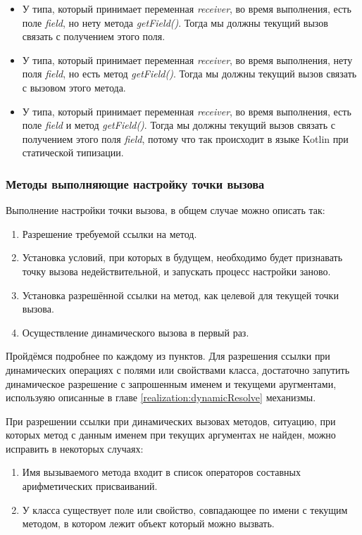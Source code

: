 \begin{itemize}
    \item У типа, который принимает переменная \textit{receiver}, во время выполнения, есть поле \textit{field}, но нету метода \textit{getField()}. Тогда мы должны текущий вызов связать с получением этого поля.
    \item У типа, который принимает переменная \textit{receiver}, во время выполнения, нету поля \textit{field}, но есть метод \textit{getField()}. Тогда мы должны текущий вызов связать с вызовом этого метода.
    \item У типа, который принимает переменная \textit{receiver}, во время выполнения, есть поле \textit{field} и метод \textit{getField()}. Тогда мы должны текущий вызов связать с получением этого поля \textit{field}, потому что так происходит в языке Kotlin при статической типизации.
\end{itemize}

\subsubsection{Методы выполняющие настройку точки вызова}

Выполнение настройки точки вызова, в общем случае можно описать так:

\begin{enumerate}
\item Разрешение требуемой ссылки на метод.
\item Установка условий, при которых в будущем, необходимо будет признавать точку вызова недействительной, и запускать процесс настройки заново.
\item Установка разрешённой ссылки на метод, как целевой для текущей точки вызова.
\item Осуществление динамического вызова в первый раз.
\end{enumerate}

Пройдёмся подробнее по каждому из пунктов. Для разрешения ссылки при динамических операциях с полями или свойствами класса, достаточно запутить динамическое разрешение с запрошенным именем и текущеми аругментами, используяю описанные в главе \ref{realization:dynamicResolve} механизмы.

При разрешении ссылки при динамических вызовах методов, ситуацию, при которых метод с данным именем при текущих аргументах не найден, можно исправить в некоторых случаях:

\begin{enumerate}
    \item Имя вызываемого метода входит в список операторов составных арифметических присваиваний.
    \item У класса существует поле или свойство, совпадающее по имени с текущим методом, в котором лежит объект который можно вызвать.
\end{enumerate}


